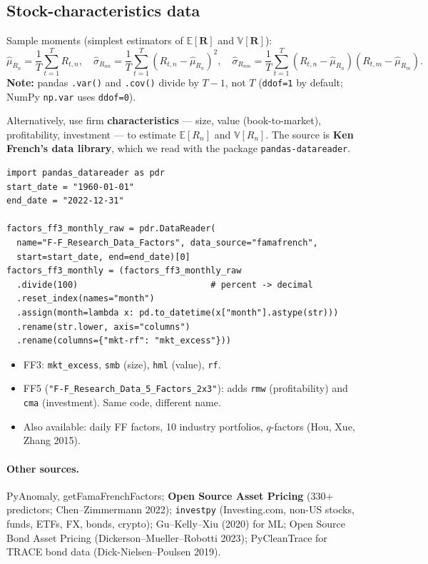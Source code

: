\documentclass[11pt,a4paper]{report}
\newcommand{\E}{\mathbb{E}}
\newcommand{\V}{\mathbb{V}}
\newcommand{\R}{\bm{R}}
\begin{document}
\subsection{Stock-characteristics data}
Sample moments (simplest estimators of $\E[\R]$ and $\V[\R]$):
\[
\hat\mu_{R_n}=\frac1T\sum_{t=1}^T R_{t,n},\quad
\hat\sigma_{R_{nn}}=\frac1T\sum_{t=1}^T(R_{t,n}-\hat\mu_{R_n})^2,\quad
\hat\sigma_{R_{nm}}=\frac1T\sum_{t=1}^T(R_{t,n}-\hat\mu_{R_n})(R_{t,m}-\hat\mu_{R_m}).
\]
\textbf{Note:} pandas \texttt{.var()} and \texttt{.cov()} divide by $T-1$, not $T$
(\texttt{ddof=1} by default; NumPy \texttt{np.var} uses \texttt{ddof=0}).

Alternatively, use firm \textbf{characteristics} --- size, value (book-to-market),
profitability, investment --- to estimate $\E[R_n]$ and $\V[R_n]$. The
source is \textbf{Ken French's data library}, which we read with the package
\texttt{pandas-datareader}.

\begin{lstlisting}
import pandas_datareader as pdr
start_date = "1960-01-01"
end_date = "2022-12-31"

factors_ff3_monthly_raw = pdr.DataReader(
  name="F-F_Research_Data_Factors", data_source="famafrench",
  start=start_date, end=end_date)[0]
factors_ff3_monthly = (factors_ff3_monthly_raw
  .divide(100)                          # percent -> decimal
  .reset_index(names="month")
  .assign(month=lambda x: pd.to_datetime(x["month"].astype(str)))
  .rename(str.lower, axis="columns")
  .rename(columns={"mkt-rf": "mkt_excess"}))
\end{lstlisting}
\begin{itemize}
  \item FF3: \texttt{mkt\_excess}, \texttt{smb} (size), \texttt{hml} (value), \texttt{rf}.
  \item FF5 (\texttt{"F-F\_Research\_Data\_5\_Factors\_2x3"}): adds \texttt{rmw}
    (profitability) and \texttt{cma} (investment). Same code, different name.
  \item Also available: daily FF factors, 10 industry portfolios, $q$-factors
    (Hou, Xue, Zhang 2015).
\end{itemize}

\paragraph{Other sources.} PyAnomaly, getFamaFrenchFactors; \textbf{Open Source
Asset Pricing} (330+ predictors; Chen--Zimmermann 2022); \texttt{investpy}
(Investing.com, non-US stocks, funds, ETFs, FX, bonds, crypto); Gu--Kelly--Xiu
(2020) for ML; Open Source Bond Asset Pricing (Dickerson--Mueller--Robotti 2023);
PyCleanTrace for TRACE bond data (Dick-Nielsen--Poulsen 2019).
\end{document}
